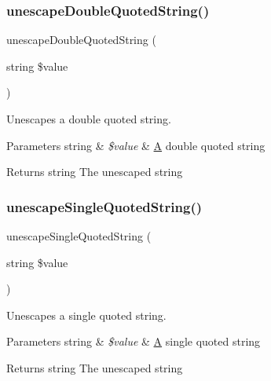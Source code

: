 \subsubsection{\texorpdfstring{unescape\+Double\+Quoted\+String()}{unescapeDoubleQuotedString()}}
{\footnotesize\ttfamily unescape\+Double\+Quoted\+String (\begin{DoxyParamCaption}\item[{string}]{\$value }\end{DoxyParamCaption})}

Unescapes a double quoted string.


\begin{DoxyParams}[1]{Parameters}
string & {\em \$value} & \mbox{\hyperlink{class_a}{A}} double quoted string\\
\hline
\end{DoxyParams}
\begin{DoxyReturn}{Returns}
string The unescaped string 
\end{DoxyReturn}
\mbox{\label{class_symfony_1_1_component_1_1_yaml_1_1_unescaper_a2a881a3d1cb8448f933f7e2809bd2396}} 
\subsubsection{\texorpdfstring{unescape\+Single\+Quoted\+String()}{unescapeSingleQuotedString()}}
{\footnotesize\ttfamily unescape\+Single\+Quoted\+String (\begin{DoxyParamCaption}\item[{string}]{\$value }\end{DoxyParamCaption})}

Unescapes a single quoted string.


\begin{DoxyParams}[1]{Parameters}
string & {\em \$value} & \mbox{\hyperlink{class_a}{A}} single quoted string\\
\hline
\end{DoxyParams}
\begin{DoxyReturn}{Returns}
string The unescaped string 
\end{DoxyReturn}


